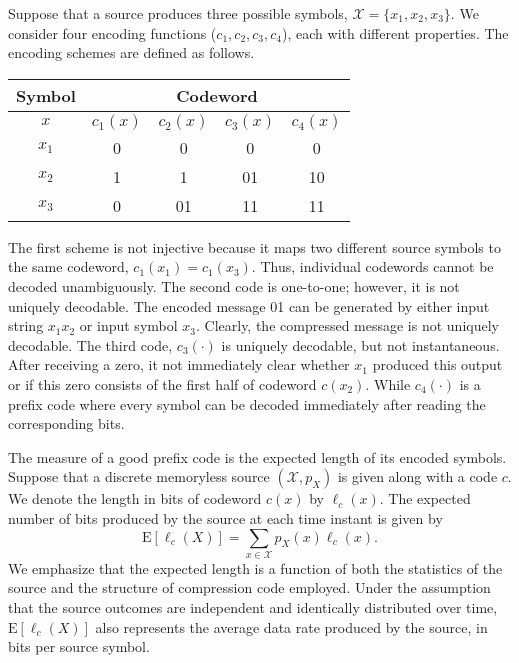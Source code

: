 \begin{example}
Suppose that a source produces three possible symbols, $\mathcal{X} = \{ x_1, x_2, x_3 \}$.
We consider four encoding functions ($c_1, c_2, c_3, c_4$), each with different properties.
The encoding schemes are defined as follows.

\begin{center}
\begin{tabular}{|c|c|c|c|c|}
\hline
Symbol & \multicolumn{4}{c|}{Codeword} \\
\hline
$x$ & $c_1(x)$ & $c_2(x)$ & $c_3(x)$ & $c_4(x)$ \\
\hline
$x_1$ & 0 & 0 & 0 & 0 \\
$x_2$ & 1 & 1 & 01 & 10 \\
$x_3$ & 0 & 01 & 11 & 11 \\
\hline
\end{tabular}
\end{center}

The first scheme is not injective because it maps two different source symbols to the same codeword, $c_1(x_1) = c_1(x_3)$.
Thus, individual codewords cannot be decoded unambiguously.
The second code is one-to-one; however, it is not uniquely decodable.
The encoded message 01 can be generated by either input string $x_1 x_2$ or input symbol $x_3$.
Clearly, the compressed message is not uniquely decodable.
The third code, $c_3(\cdot)$ is uniquely decodable, but not instantaneous.
After receiving a zero, it not immediately clear whether $x_1$ produced this output or if this zero consists of the first half of codeword $c(x_2)$.
While $c_4(\cdot)$ is a prefix code where every symbol can be decoded immediately after reading the corresponding bits.
\end{example}

The measure of a good prefix code is the expected length of its encoded symbols.
Suppose that a discrete memoryless source $(\mathcal{X}, p_X)$ is given along with a code $c$.
We denote the length in bits of codeword $c(x)$ by $\ell_c(x)$.
The expected number of bits produced by the source at each time instant is given by
\begin{equation} \label{equation:CodeRateCompression}
\mathrm{E} [ \ell_c (X) ] = \sum_{x \in \mathcal{X}} p_X(x) \ell_c(x) .
\end{equation}
We emphasize that the expected length is a function of both the statistics of the source and the structure of compression code employed.
Under the assumption that the source outcomes are independent and identically distributed over time, $\mathrm{E} [ \ell_c (X)]$ also represents the average data rate produced by the source, in bits per source symbol.


